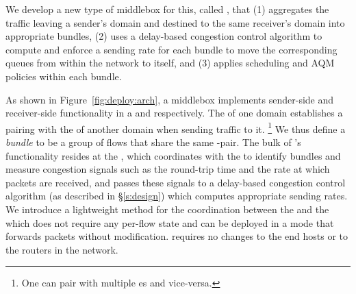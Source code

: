 
We develop a new type of middlebox for this, called \name, that (1) aggregates the traffic leaving a sender's domain and destined to the same receiver's domain into appropriate bundles, (2) uses a delay-based congestion control algorithm to compute and enforce a sending rate for each bundle to move the corresponding queues from within the network to itself, and (3) applies scheduling and AQM policies within each bundle. 


As shown in Figure~\ref{fig:deploy:arch}, a \name middlebox implements sender-side and receiver-side functionality in a \emph{\inbox} and \emph{\outbox} respectively. The \inbox of one domain establishes a pairing with the \outbox of another domain when sending traffic to it. \footnote{One \inbox can pair with multiple {\outbox}es and vice-versa.} We thus define a \emph{bundle} to be a group of flows that share the same \inbox-\outbox pair.
The bulk of \name's functionality resides at the \inbox, which coordinates with the \outbox to identify bundles and measure congestion signals such as the round-trip time and the rate at which packets are received, and passes these signals to a delay-based congestion control algorithm (as described in \S\ref{s:design}) which computes appropriate sending rates.
We introduce a lightweight method for the coordination between the \inbox and the \outbox which does not require any per-flow state and can be deployed in a mode that forwards packets without modification.  \name requires no changes to the end hosts or to the routers in the network.
 
